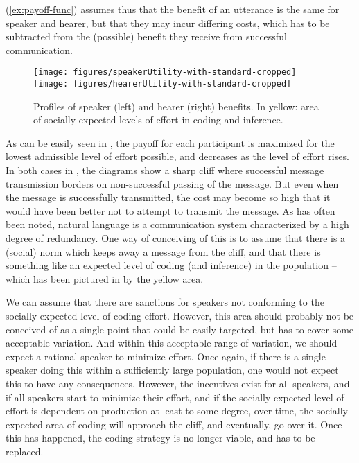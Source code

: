 \documentclass[output=paper,hidelinks]{langscibook}
\begin{document}
(\ref{ex:payoff-func}) assumes thus that the benefit of an utterance is the same for speaker and hearer, but that they may incur differing costs, which has to be subtracted from the (possible) benefit they receive from successful communication. 

\begin{figure}
  \hfill\texttt{[image: figures/speakerUtility-with-standard-cropped]}\hfill%
  \texttt{[image: figures/hearerUtility-with-standard-cropped]}\hfill%
  \caption{Profiles of speaker (left) and hearer (right) benefits. In yellow: area of socially expected levels of effort in coding and inference.}
  \label{fig:shbenefits}
\end{figure}

As can be easily seen in , the payoff for each participant is maximized for the lowest admissible level of effort possible, and decreases as the level of effort rises.
In both cases in , the diagrams show a sharp cliff where successful message transmission borders on non-successful passing of the message. But even when the message is successfully transmitted, the cost may become so high that it would have been better not to attempt to transmit the message. As has often been noted, natural language is a communication system characterized by a high degree of redundancy. One way of conceiving of this is to assume that there is a (social) norm which keeps away a message from the cliff, and that there is something like an expected level of coding (and inference) in the population -- which has been pictured in  by the yellow area.

We can assume that there are sanctions for speakers not conforming to the socially expected level of coding effort. However, this area should probably not be conceived of as a single point that could be easily targeted, but has to cover some acceptable variation. And within this acceptable range of variation, we should expect a rational speaker to minimize effort. Once again, if there is a single speaker doing this within a sufficiently large population, one would not expect this to have any consequences. However, the incentives exist for all speakers, and if all speakers start to minimize their effort, and if the socially expected level of effort is dependent on production at least to some degree, over time, the socially expected area of coding will approach the cliff, and eventually, go over it. Once this has happened, the coding strategy is no longer viable, and has to be replaced.
\end{document}
